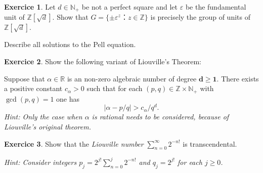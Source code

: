 \documentclass[12pt,a4paper]{article}
\theoremstyle{plain}
\newtheorem*{Sol*}{Solution}
\theoremstyle{definition}
\newtheorem{Ex}{Exercice}
\newif\ifsolutions
\newcommand{\exercise}[2]{
			\begin{Ex} #1 \end{Ex}
			\ifsolutions  \begin{Sol*} #2 \end{Sol*} \bigskip \else \bigskip  \fi
		}
\begin{document}
\exercise{ Let $d ∈ ℕ_+$ be not a perfect square and let $ε$ be the fundamental unit of $ℤ[\sqrt{d}]$. Show that $G = \{ \pm ε ^z ： z ∈ℤ\}$  is precisely the group of units of $ℤ[\sqrt{d}]$.

  \bigskip
  
  \noindent
  Describe all solutions to the Pell equation. 
}
{
	Let $\alpha = x + y\sqrt{d}$ be a unit of $Z[\sqrt{d}]$. We show that $\alpha$ belongs to $G$.

	We may write $x - y\sqrt{d}, -x + y\sqrt{d}$, and $-x - y\sqrt{d}$ as $\pm \alpha^{-1}$ and $-\alpha$, so that we may suppose $x, y \geq 0$.

	The case $x=1, y=0$ corresponds to $n=0$ in $G$, which lets us assume that $\alpha > 1$.

	There therefore exists an $n \geq 1$ such that
		\[ \epsilon^n \leq \alpha < \epsilon^{n+1}, \]
	by minimality of $\epsilon$.

	This means that $1 \leq \alpha \epsilon^{-n} < \alpha$. 
	By exercise 4ii), one must have $\alpha = \epsilon^n$, which concludes.
}



\exercise{
  Show the following variant of Liouville's Theorem:

  \bigskip 
  
  \noindent  
    Suppose that $α∈ ℝ$ is an non-zero algebraic number of degree $\mathbf{d ≥1}$. There exists a positive constant $c_α>0$ such that for each $(p,q) ∈ ℤ×ℕ_+$ with $\gcd(p,q) = 1$ one has
  \begin{displaymath}
    |α - p/q| > c_α/q^d. 
  \end{displaymath}
\smallskip 
\noindent 
\emph{Hint: Only the case when $α$ is rational needs to be considered, because of Liouville's original theorem.}
}{}


\exercise{Show that the \emph{Liouville number} $∑_{n=0}^{∞} 2^{-n!}$ is transcendental.

  \bigskip

\emph{Hint:   Consider integers  $p_j = 2^{j!} ∑_{n=0}^j 2^{-n!}$ and $q_j = 2^{j!}$ for each $j \geq 0$. }
  
}{}
  
\end{document}
